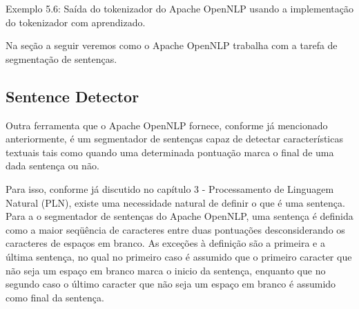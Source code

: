 \documentclass[11pt]{report}
\begin{document}
\begin{quote}
                 
             
     \fbox{,}                    \fbox{,}                   \fbox{,}            
   
\end{quote}
\begin{center}
  Exemplo 5.6: Saída do tokenizador do Apache OpenNLP usando a implementação do tokenizador com aprendizado.
\end{center}

Na seção a seguir veremos como o Apache OpenNLP trabalha com a tarefa de segmentação de sentenças.

\subsection{Sentence Detector}

\indent\indent Outra ferramenta que o Apache OpenNLP fornece, conforme já mencionado anteriormente, é um segmentador de sentenças capaz de detectar características textuais
tais como quando uma determinada pontuação marca o final de uma dada sentença ou não.

Para isso, conforme já discutido no capítulo 3 - Processamento de Linguagem Natural (PLN), existe uma
necessidade natural de definir o que é uma sentença. Para a o segmentador de sentenças do Apache OpenNLP, uma sentença é definida como a maior seqüência de caracteres entre duas
pontuações desconsiderando os caracteres de espaços em branco. As exceções à definição são a primeira e a última sentença, no qual no primeiro caso é assumido que o primeiro caracter que não
seja um espaço em branco marca o inicio da sentença, enquanto que no segundo caso o último caracter que não seja um espaço em branco é assumido como final da sentença.
\end{document}
